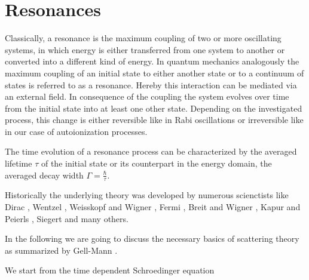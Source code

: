 \section{Resonances}

Classically, a resonance is the maximum coupling of two or more
oscillating systems, in which energy is either transferred from 
one system to another or converted into a different kind of energy.
In quantum mechanics analogously the maximum coupling of an initial 
state to either 
another state or to
a continuum of states is referred to as a resonance. Hereby this
interaction can be mediated via an external field.
In consequence of the coupling the system evolves over time from
the initial state into at least one other state. Depending on the investigated
process, this change is either reversible like in Rabi oscillations \cite{Rabi}
or irreversible like in our case of autoionization processes.

The time evolution of a resonance process can be characterized by
the averaged lifetime $\tau$ of the initial state or its counterpart
in the energy domain,
the averaged decay width $\Gamma = \frac{\hbar}{\tau}$.

Historically the underlying theory was developed by numerous scienctists
like Dirac \cite{Dirac27_1,Dirac27_2}, Wentzel \cite{Wentzel27}, 
Weisskopf and Wigner \cite{Weisskopf30},
Fermi \cite{Fermi32}, Breit and Wigner \cite{Breit36},
Kapur and Peierls \cite{Kapur38}, Siegert \cite{Siegert39} and many others.

In the following we are going to discuss the necessary basics of scattering
theory as summarized by Gell-Mann \cite{Gell-Mann53}.




We start from the time dependent Schroedinger equation

